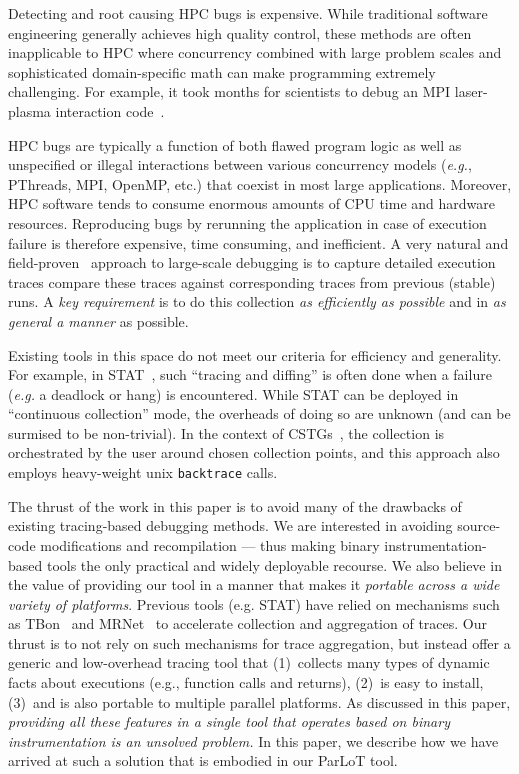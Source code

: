 ﻿
Detecting and root causing HPC bugs is expensive. While traditional software engineering generally achieves high quality control, these methods are often inapplicable to HPC where concurrency combined with large problem scales and sophisticated domain-specific math can make programming extremely challenging. For example, it took months for scientists to debug an MPI laser-plasma interaction code~\cite{hpcdoe}.

HPC bugs are typically a function of both flawed program logic as well as unspecified or illegal interactions between various concurrency models ({\em e.g.}, PThreads, MPI, OpenMP, etc.) that coexist in most large applications. Moreover, HPC software tends to consume enormous amounts of CPU time and hardware resources. Reproducing bugs by rerunning the application in case of execution failure is therefore expensive, time consuming, and inefficient. 
A very natural and field-proven~\cite{stat,cstg} approach to large-scale debugging is to
capture detailed execution traces
compare these traces
 against corresponding
 traces from previous (stable) runs.
%
A {\em key requirement} is to do this collection {\em as efficiently as possible}
and in {\em as general a manner} as possible.
%

Existing tools in this space
do not meet our criteria for efficiency and generality.
%
For example, in STAT~\cite{stat}, such ``tracing and diffing'' is often done
when a failure ({\em e.g.} a deadlock or hang) is encountered.
%
While STAT can be deployed in ``continuous collection'' mode, the overheads of
doing so are unknown (and can be surmised to be non-trivial).
%
In the context of CSTGs~\cite{cstg}, the collection is orchestrated by the
user around chosen collection points, and this approach also employs heavy-weight
unix {\tt backtrace} calls.


The thrust of the work in this paper is to avoid many of the drawbacks of existing
tracing-based debugging methods.
%
We are interested in avoiding
source-code modifications and recompilation --- thus making binary
instrumentation-based tools the only practical and widely deployable recourse.
%
We also believe in the value
of providing our tool in a manner that makes it {\em portable across a 
wide variety of platforms}.
%
Previous tools (e.g. STAT) have relied on  mechanisms such as
TBon~\cite{tbon-dorian} and MRNet~\cite{mrnet} to accelerate collection and
aggregation of traces.
%
Our thrust is to not rely on such mechanisms for trace aggregation, but
instead offer 
a generic and low-overhead tracing tool that 
(1)~collects many types of dynamic facts about executions (e.g., function
calls and returns), 
(2)~is easy to install, 
(3)~and is also portable to multiple parallel platforms.
%
As discussed in this paper, {\em providing all these features in a single tool
that operates based on binary instrumentation
is an unsolved problem.}
%
In this paper, we describe how we have arrived at such a solution that is embodied
in our ParLoT tool.


